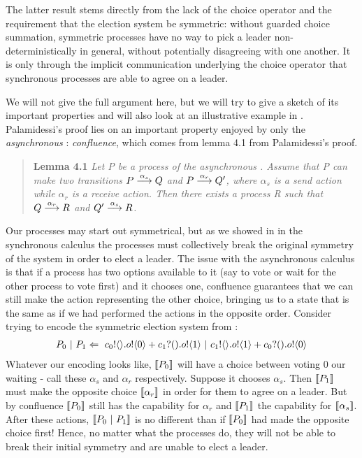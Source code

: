 The latter result stems directly from the lack of the choice operator and the requirement that the election system be symmetric: without guarded choice summation, symmetric processes have no way to pick a leader non-deterministically in general, without potentially disagreeing with one another.  
It is only through the implicit communication underlying the choice operator that synchronous processes are able to agree on a leader.

We will not give the full argument here, but we will try to give a sketch of its important properties and will also look at an illustrative example in .  
Palamidessi's proof lies on an important property enjoyed by only the \emph{asynchronous} \picalc:  
\emph{confluence}, which comes from lemma 4.1 from Palamidessi's proof.
\begin{quote}
	\textbf{Lemma 4.1} \emph{Let P be a process of the asynchronous \picalc.  Assume that P can make two transitions $P \overset{{\alpha_s}}{\longrightarrow} Q$ and $P \overset{{\alpha_r}}{\longrightarrow} Q'$, where $\alpha_s$ is a send action while $\alpha_r$ is a receive action.  Then there exists a process R such that $Q \overset{{\alpha_r}}{\longrightarrow} R$ and $Q' \overset{{\alpha_s}}{\longrightarrow} R$.}
\end{quote}
Our processes may start out symmetrical, but as we showed in  in the synchronous calculus the processes must collectively break the original symmetry of the system in order to elect a leader.  
The issue with the asynchronous calculus is that if a process has two options available to it (say to vote or wait for the other process to vote first) and it chooses one, confluence guarantees that we can still make the action representing the other choice, bringing us to a state that is the same as if we had performed the actions in the opposite order.  
Consider trying to encode the symmetric election system from :
\begin{align}
	P_0\ |\  P_1 \Leftarrow\  {c_0}!\langle{}\rangle. {o}!\langle{0}\rangle + {c_1}?({}). {o}!\langle{1}\rangle \ |\  {c_1}!\langle{}\rangle. {o}!\langle{1}\rangle + {c_0}?({}). {o}!\langle{0}\rangle
	\label{leader_network_term2}	
\end{align}
Whatever our encoding looks like, $\llbracket{P_0}\rrbracket$ will have a choice between voting 0 our waiting - call these $\alpha_s$ and $\alpha_r$ respectively.  
Suppose it chooses $\alpha_s$.  
Then $\llbracket{P_1}\rrbracket$ must make the opposite choice $\llbracket{\alpha_r}\rrbracket$ in order for them to agree on a leader.  
But by confluence $\llbracket{P_0}\rrbracket$ still has the capability for $\alpha_r$ and $\llbracket{P_1}\rrbracket$ the capability for $\llbracket{\alpha_s}\rrbracket$.  
After these actions, $\llbracket{P_0  \ensuremath{\ |\ } P_1}\rrbracket$ is no different than if $\llbracket{P_0}\rrbracket$ had made the opposite choice first!  Hence, no matter what the processes do, they will not be able to break their initial symmetry and are unable to elect a leader.

